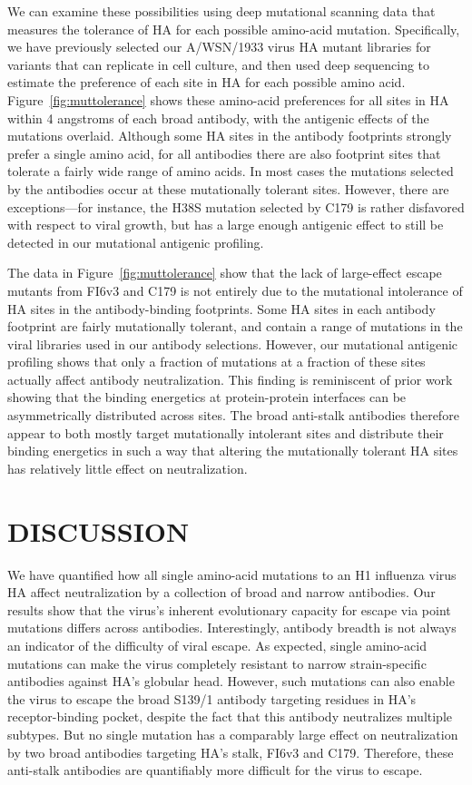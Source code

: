 \documentclass[11pt]{article}
\begin{document}
We can examine these possibilities using deep mutational scanning data that measures the tolerance of HA for each possible amino-acid mutation.
Specifically, we have previously selected our A/WSN/1933 virus HA mutant libraries for variants that can replicate in cell culture, and then used deep sequencing to estimate the preference of each site in HA for each possible amino acid\cite{doud2016accurate}.
Figure~\ref{fig:muttolerance} shows these amino-acid preferences for all sites in HA within 4 angstroms of each broad antibody, with the antigenic effects of the mutations overlaid.
Although some HA sites in the antibody footprints strongly prefer a single amino acid, for all antibodies there are also footprint sites that tolerate a fairly wide range of amino acids.
In most cases the mutations selected by the antibodies occur at these mutationally tolerant sites.
However, there are exceptions---for instance, the H38S mutation selected by C179 is rather disfavored with respect to viral growth, but has a large enough antigenic effect to still be detected in our mutational antigenic profiling.

The data in Figure~\ref{fig:muttolerance} show that the lack of large-effect escape mutants from FI6v3 and C179 is not entirely due to the mutational intolerance of HA sites in the antibody-binding footprints.
Some HA sites in each antibody footprint are fairly mutationally tolerant, and contain a range of mutations in the viral libraries used in our antibody selections.
However, our mutational antigenic profiling shows that only a fraction of mutations at a fraction of these sites actually affect antibody neutralization.
This finding is reminiscent of prior work showing that the binding energetics at protein-protein interfaces can be asymmetrically distributed across sites\cite{jin1992high,cunningham1993comparison,dall1998mutational}.
The broad anti-stalk antibodies therefore appear to both mostly target mutationally intolerant sites and distribute their binding energetics in such a way that altering the mutationally tolerant HA sites has relatively little effect on neutralization.

\section*{DISCUSSION}
We have quantified how all single amino-acid mutations to an H1 influenza virus HA affect neutralization by a collection of broad and narrow antibodies.
Our results show that the virus's inherent evolutionary capacity for escape via point mutations differs across antibodies. 
Interestingly, antibody breadth is not always an indicator of the difficulty of viral escape. 
As expected, single amino-acid mutations can make the virus completely resistant to narrow strain-specific antibodies against HA's globular head.
However, such mutations can also enable the virus to escape the broad S139/1 antibody targeting residues in HA's receptor-binding pocket, despite the fact that this antibody neutralizes multiple subtypes.
But no single mutation has a comparably large effect on neutralization by two broad antibodies targeting HA's stalk, FI6v3 and C179.
Therefore, these anti-stalk antibodies are quantifiably more difficult for the virus to escape.
\end{document}
